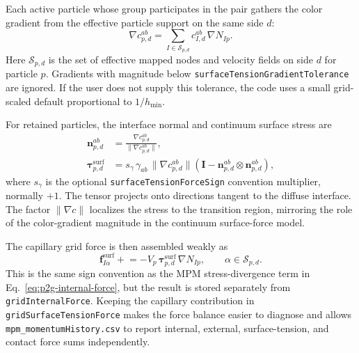 Each active particle whose group participates in the pair gathers the color gradient from the effective particle support on the same side $d$:
\begin{equation}
  \nabla c^{ab}_{p,d} =
  \sum_{I\in\mathcal{S}_{p,d}} c^{ab}_{I,d}\,\nabla N_{Ip}.
\end{equation}
Here $\mathcal{S}_{p,d}$ is the set of effective mapped nodes and velocity fields on side $d$ for particle $p$.  Gradients with magnitude below \texttt{surfaceTensionGradientTolerance} are ignored.  If the user does not supply this tolerance, the code uses a small grid-scaled default proportional to $1/h_{\min}$.

For retained particles, the interface normal and continuum surface stress are
\begin{align}
  \mathbf{n}_{p,d}^{ab} &=
  \frac{\nabla c^{ab}_{p,d}}{\|\nabla c^{ab}_{p,d}\|}, \\
  \boldsymbol{\tau}^{\mathrm{surf}}_{p,d} &=
  s_{\gamma}\,\gamma_{ab}\,\|\nabla c^{ab}_{p,d}\|
  \left(\mathbf{I}-\mathbf{n}_{p,d}^{ab}\otimes\mathbf{n}_{p,d}^{ab}\right),
\end{align}
where $s_{\gamma}$ is the optional \texttt{surfaceTensionForceSign} convention multiplier, normally $+1$.  The tensor projects onto directions tangent to the diffuse interface.  The factor $\|\nabla c\|$ localizes the stress to the transition region, mirroring the role of the color-gradient magnitude in the continuum surface-force model.

The capillary grid force is then assembled weakly as
\begin{equation}
  \mathbf{f}^{\mathrm{surf}}_{I\alpha}
  \mathrel{+}= -V_p\,\boldsymbol{\tau}^{\mathrm{surf}}_{p,d}\,\nabla N_{Ip},
  \qquad \alpha\in\mathcal{S}_{p,d}.
  \label{eq:mpm-surface-tension-force}
\end{equation}
This is the same sign convention as the MPM stress-divergence term in Eq.~\eqref{eq:p2g-internal-force}, but the result is stored separately from \texttt{gridInternalForce}.  Keeping the capillary contribution in \texttt{gridSurfaceTensionForce} makes the force balance easier to diagnose and allows \texttt{mpm\_momentumHistory.csv} to report internal, external, surface-tension, and contact force sums independently.

